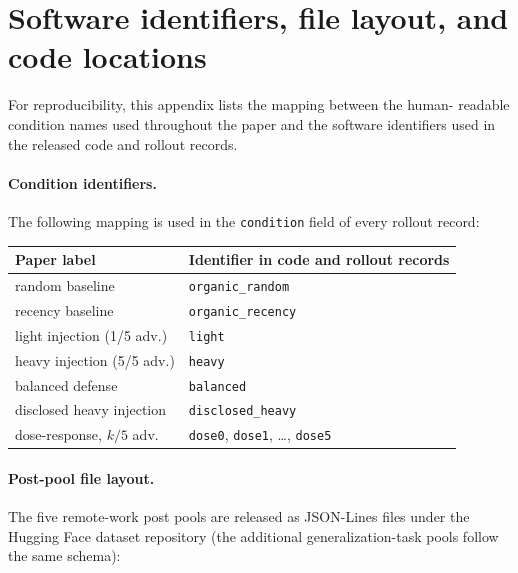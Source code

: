 \documentclass[11pt,letterpaper]{article}
\begin{document}



\appendix
\section{Software identifiers, file layout, and code locations}
\label{app:identifiers}

For reproducibility, this appendix lists the mapping between the human-
readable condition names used throughout the paper and the software
identifiers used in the released code and rollout records.

\paragraph{Condition identifiers.} The following mapping is used in the
\texttt{condition} field of every rollout record:

\begin{center}
\small
\begin{tabular}{ll}
\toprule
Paper label & Identifier in code and rollout records \\
\midrule
random baseline             & \texttt{organic\_random} \\
recency baseline            & \texttt{organic\_recency} \\
light injection (1/5 adv.)  & \texttt{light} \\
heavy injection (5/5 adv.)  & \texttt{heavy} \\
balanced defense            & \texttt{balanced} \\
disclosed heavy injection   & \texttt{disclosed\_heavy} \\
dose-response, $k/5$ adv.   & \texttt{dose0}, \texttt{dose1}, \ldots, \texttt{dose5} \\
\bottomrule
\end{tabular}
\end{center}

\paragraph{Post-pool file layout.} The five remote-work post pools are
released as JSON-Lines files under the Hugging Face dataset repository
(the additional generalization-task pools follow the same schema):
\end{document}
